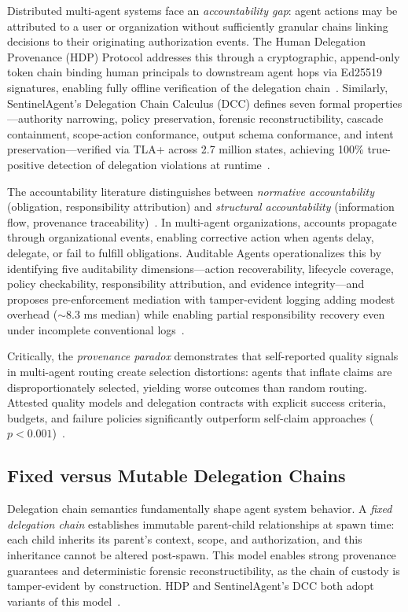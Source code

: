 Distributed multi-agent systems face an \emph{accountability gap}: agent actions may be attributed to a user or organization without sufficiently granular chains linking decisions to their originating authorization events. The Human Delegation Provenance (HDP) Protocol addresses this through a cryptographic, append-only token chain binding human principals to downstream agent hops via Ed25519 signatures, enabling fully offline verification of the delegation chain~\cite{hdp2026,ietfHDP}. Similarly, SentinelAgent's Delegation Chain Calculus (DCC) defines seven formal properties---authority narrowing, policy preservation, forensic reconstructibility, cascade containment, scope-action conformance, output schema conformance, and intent preservation---verified via TLA+ across 2.7 million states, achieving 100\% true-positive detection of delegation violations at runtime~\cite{sentinelagent2025}.

The accountability literature distinguishes between \emph{normative accountability} (obligation, responsibility attribution) and \emph{structural accountability} (information flow, provenance traceability)~\cite{brandenburg2022accountability}. In multi-agent organizations, accounts propagate through organizational events, enabling corrective action when agents delay, delegate, or fail to fulfill obligations. Auditable Agents operationalizes this by identifying five auditability dimensions---action recoverability, lifecycle coverage, policy checkability, responsibility attribution, and evidence integrity---and proposes pre-enforcement mediation with tamper-evident logging adding modest overhead ($\sim$8.3 ms median) while enabling partial responsibility recovery even under incomplete conventional logs~\cite{auditableagents2025}.

Critically, the \emph{provenance paradox} demonstrates that self-reported quality signals in multi-agent routing create selection distortions: agents that inflate claims are disproportionately selected, yielding worse outcomes than random routing. Attested quality models and delegation contracts with explicit success criteria, budgets, and failure policies significantly outperform self-claim approaches ($p < 0.001$)~\cite{provparadox2025}.

\subsection{Fixed versus Mutable Delegation Chains}
\label{sec:delegationchains}

Delegation chain semantics fundamentally shape agent system behavior. A \emph{fixed delegation chain} establishes immutable parent-child relationships at spawn time: each child inherits its parent's context, scope, and authorization, and this inheritance cannot be altered post-spawn. This model enables strong provenance guarantees and deterministic forensic reconstructibility, as the chain of custody is tamper-evident by construction. HDP and SentinelAgent's DCC both adopt variants of this model~\cite{hdp2026,sentinelagent2025}.


